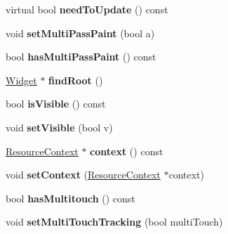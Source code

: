 \begin{DoxyCompactItemize}
\item 
\hypertarget{class_tempest_1_1_widget_adf8213f25fd78bd3035b3b22502e5e18}{virtual bool {\bfseries need\+To\+Update} () const }\label{class_tempest_1_1_widget_adf8213f25fd78bd3035b3b22502e5e18}

\item 
\hypertarget{class_tempest_1_1_widget_a75091f41eeaa61f236802e9479985d8e}{void {\bfseries set\+Multi\+Pass\+Paint} (bool a)}\label{class_tempest_1_1_widget_a75091f41eeaa61f236802e9479985d8e}

\item 
\hypertarget{class_tempest_1_1_widget_a7e259de145b1bb458914bd2523ecb70d}{bool {\bfseries has\+Multi\+Pass\+Paint} () const }\label{class_tempest_1_1_widget_a7e259de145b1bb458914bd2523ecb70d}

\item 
\hypertarget{class_tempest_1_1_widget_ae24d817affe0cd13bc898e4f0b1c5eda}{\hyperlink{class_tempest_1_1_widget}{Widget} $\ast$ {\bfseries find\+Root} ()}\label{class_tempest_1_1_widget_ae24d817affe0cd13bc898e4f0b1c5eda}

\item 
\hypertarget{class_tempest_1_1_widget_aa5a6dc5780c82ba1d4b9f218004c6682}{bool {\bfseries is\+Visible} () const }\label{class_tempest_1_1_widget_aa5a6dc5780c82ba1d4b9f218004c6682}

\item 
\hypertarget{class_tempest_1_1_widget_ab6fc8272bd94e15306aab488021e4467}{void {\bfseries set\+Visible} (bool v)}\label{class_tempest_1_1_widget_ab6fc8272bd94e15306aab488021e4467}

\item 
\hypertarget{class_tempest_1_1_widget_a3a20e2def76a34125f7f787eacd54cc3}{\hyperlink{class_tempest_1_1_resource_context}{Resource\+Context} $\ast$ {\bfseries context} () const }\label{class_tempest_1_1_widget_a3a20e2def76a34125f7f787eacd54cc3}

\item 
\hypertarget{class_tempest_1_1_widget_a8e443c1d918877ab9a408e8b037a9883}{void {\bfseries set\+Context} (\hyperlink{class_tempest_1_1_resource_context}{Resource\+Context} $\ast$context)}\label{class_tempest_1_1_widget_a8e443c1d918877ab9a408e8b037a9883}

\item 
\hypertarget{class_tempest_1_1_widget_aa8fe08642c997ef2464b175f346ec9d9}{bool {\bfseries has\+Multitouch} () const }\label{class_tempest_1_1_widget_aa8fe08642c997ef2464b175f346ec9d9}

\item 
\hypertarget{class_tempest_1_1_widget_a0252830d55e8510f38daaf8de1ab6f27}{void {\bfseries set\+Multi\+Touch\+Tracking} (bool multi\+Touch)}\label{class_tempest_1_1_widget_a0252830d55e8510f38daaf8de1ab6f27}

\end{DoxyCompactItemize}
